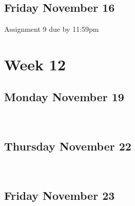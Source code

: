 \documentclass[]{book}
\let\originaltabular\tabular
\let\endoriginaltabular\endtabular
\renewenvironment{tabular}[1]{%
  \begingroup%
  \centering%
  \originaltabular{#1}}%
  {\endoriginaltabular\endgroup}
\theoremstyle{definition}
\theoremstyle{definition}
\theoremstyle{definition}
\theoremstyle{remark}
\begin{document}
\begin{table}[H]
\centering
\begin{tabular}{l}
\hline
\\
\hline
\end{tabular}
\end{table}

\subsection{Friday November 16}\label{friday-november-16}

\begin{table}[H]
\centering
\begin{tabular}{l}
\hline
Assignment 9 due by 11:59pm\\
\hline
\end{tabular}
\end{table}

\section{Week 12}\label{week-12}

\subsection{Monday November 19}\label{monday-november-19}

\begin{table}[H]
\centering
\begin{tabular}{l}
\hline
\\
\hline
\end{tabular}
\end{table}

\subsection{Thursday November 22}\label{thursday-november-22}

\begin{table}[H]
\centering
\begin{tabular}{l}
\hline
\\
\hline
\end{tabular}
\end{table}

\subsection{Friday November 23}\label{friday-november-23}
\end{document}
